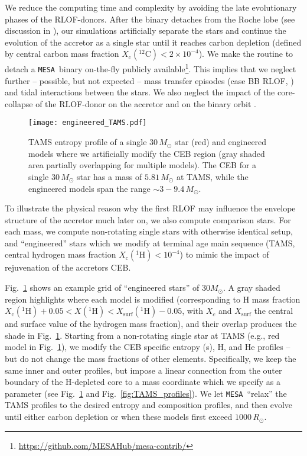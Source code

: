 \documentclass[twocolumn,twocolappendix,trackchanges]{aastex63}
\newcommand{\code}[1]{\texttt{#1}}
\newcommand{\mesa}{\code{MESA}}
\DeclareRobustCommand{\Figref}[1]{Fig.~\ref{#1}}
\begin{document}
We reduce the computing time and complexity by avoiding the late
evolutionary phases of the RLOF-donors. After the binary detaches from
the Roche lobe (see discussion in \citealt{renzo:2021zoph}), our
simulations artificially separate the stars and continue the evolution
of the accretor as a single star until it reaches carbon depletion
(defined by central carbon mass fraction
$X_\mathrm{c}(^{12}\mathrm{C})<2\times10^{-4} $). We make the routine
to detach a \mesa\ binary on-the-fly publicly
available\footnote{\url{https://github.com/MESAHub/mesa-contrib/}}.
This implies that we neglect further -- possible, but not expected --
mass transfer episodes (case BB RLOF, \citealt{laplace:2020}) and
tidal interactions between the stars. We also neglect the impact of
the core-collapse of the RLOF-donor on the accretor
\cite[e.g.,][]{hirai:2018, ogata:2021} and on the binary orbit
\citep[e.g.,][]{brandt:1995, kalogera:1996, tauris:1998,
  renzo:2019walk}.


\begin{figure}[btp]
  \texttt{[image: engineered\_TAMS.pdf]}
  \caption{TAMS entropy profile of a single 30\,$M_\odot$ star (red)
    and engineered models where we artificially modify the CEB region
    (gray shaded area partially overlapping for multiple models). The CEB for a
    single $30\,M_\odot$ star has a mass of $5.81\,M_\odot$ at TAMS,
    while the engineered models span the range $\sim3-9.4\,M_\odot$.}
  \label{fig:engineered_TAMS}
\end{figure}

To illustrate the physical reason why the first RLOF may influence the
envelope structure of the accretor much later on, we also compute
comparison stars. For each mass, we compute non-rotating single stars
with otherwise identical setup, and ``engineered'' stars which we
modify at terminal age main sequence (TAMS, central hydrogen mass
fraction $X_\mathrm{c}(^1\mathrm{H})<10^{-4}$) to mimic the impact of
rejuvenation of the accretors CEB.

\Figref{fig:engineered_TAMS} shows an example grid of ``engineered
stars'' of $30M_\odot$. A gray shaded region highlights where each
model is modified (corresponding to H mass fraction
$X_\mathrm{c}(^1\mathrm{H})+0.05<X(^1\mathrm{H})<X_\mathrm{surf}(^1\mathrm{H})-0.05$,
with $X_c$ and $X_\mathrm{surf}$ the central and surface value of the
hydrogen mass fraction), and their overlap produces the shade in
\Figref{fig:engineered_TAMS}. Starting from a non-rotating single star
at TAMS (e.g., red model in \Figref{fig:engineered_TAMS}), we modify
the CEB specific entropy (s), H, and He profiles -- but do not change
the mass fractions of other elements. Specifically, we keep the same
inner and outer profiles, but impose a linear connection from the
outer boundary of the H-depleted core to a mass coordinate which we
specify as a parameter (see \Figref{fig:engineered_TAMS} and
\Figref{fig:TAMS_profiles}). We let \mesa\ ``relax'' the TAMS profiles
to the desired entropy and composition profiles, and then evolve until
either carbon depletion or when these models first exceed
$1000\,R_\odot$.
\end{document}
